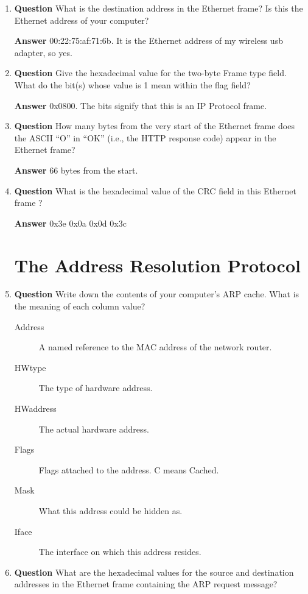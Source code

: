 \documentclass[12pt,letterpaper]{article}
\newcommand{\q}{\textbf{Question} }
\newcommand{\ans}{\textbf{Answer} }
\begin{document}
\begin{enumerate}
\item \q What is the destination address in the Ethernet frame? Is this the
    Ethernet address of your computer?

\ans 00:22:75:af:71:6b. It is the Ethernet address of my wireless usb adapter,
    so yes.

\item \q Give the hexadecimal value for the two-byte Frame type field. What do
    the bit(s) whose value is 1 mean within the flag field?

\ans 0x0800. The bits signify that this is an IP Protocol frame.

\item \q How many bytes from the very start of the Ethernet frame does the
    ASCII ``O'' in ``OK'' (i.e., the HTTP response code) appear in the
    Ethernet frame?

\ans 66 bytes from the start.

\item \q What is the hexadecimal value of the CRC field in this Ethernet frame
    ?

\ans 0x3e 0x0a 0x0d 0x3c

\pagebreak

\pagebreak


\section{The Address Resolution Protocol}
\item \q Write down the contents of your computer's ARP cache. What is the
    meaning of each column value?



\begin{description}
    \item[Address] A named reference to the MAC address of the network router.
    \item[HWtype] The type of hardware address.
    \item[HWaddress] The actual hardware address.
    \item[Flags] Flags attached to the address. C means Cached.
    \item[Mask] What this address could be hidden as.
    \item[Iface] The interface on which this address resides.
\end{description}

\item \q What are the hexadecimal values for the source and destination
    addresses in the Ethernet frame containing the ARP request message?


\end{enumerate}
\end{document}
